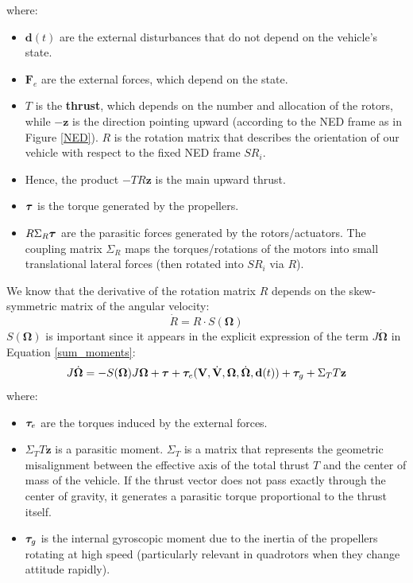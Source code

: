 \documentclass[10pt, a4paper]{report}
\begin{document}
where:\begin{itemize}
    \item $\mathbf d(t)$ are the external disturbances that do not depend on 
    the vehicle's state.
    \item $\mathbf F_e$ are the external forces, which depend on the state.
    \item $T$ is the \textbf{thrust}, which depends on the number and allocation of the rotors, while $-\mathbf z$ is the direction pointing upward (according to the NED frame as in Figure \ref{NED}). $R$ is the rotation matrix that describes the orientation of our vehicle with respect to the fixed NED frame $SR_i$.
    \item Hence, the product $-T R\mathbf z$ is the main upward thrust.
    \item ${\boldsymbol{\tau}}$ is the torque generated by the propellers.
    \item $R\Sigma_R{\boldsymbol{\tau}}$ are the parasitic forces generated by the rotors/actuators. The coupling matrix $\Sigma_R$ maps the torques/rotations of the motors into small translational lateral forces (then rotated into $SR_i$ via $R$).
\end{itemize}
We know that the derivative of the rotation matrix $R$ depends on the skew-symmetric matrix of the angular velocity:\begin{equation}
    \dot R= R\cdot S(\boldsymbol{\Omega})
\end{equation}
$S(\boldsymbol{\Omega})$ is important since it appears in the explicit expression of the term $ J\dot{\boldsymbol{\Omega}} $ in Equation \eqref{sum_moments}:
\begin{equation}
    J\dot{\boldsymbol{\Omega}}=-S(\boldsymbol{\Omega})J\boldsymbol{\Omega}+{\boldsymbol{\tau}}+
    {\boldsymbol{\tau}}_e(\mathbf V,\dot{\mathbf V},\boldsymbol{\Omega},\dot{\boldsymbol{\Omega}},\mathbf d(t))+ {\boldsymbol{\tau}}_g+ 
    \Sigma_T T \mathbf z
\end{equation}
where:\begin{itemize}
    \item ${\boldsymbol{\tau}}_e$ are the torques induced by the external forces.
    \item $\Sigma_T T \mathbf z$ is a parasitic moment. $\Sigma_T$ is a matrix that represents the geometric misalignment between the effective axis of the total thrust $T$ and the center of mass of the vehicle. If the thrust vector does not pass exactly through the center of gravity, it generates a parasitic torque proportional to the thrust itself.
    \item ${\boldsymbol{\tau}}_g$ is the internal gyroscopic moment due to the inertia of the propellers rotating at high speed (particularly relevant in quadrotors when they change attitude rapidly).
\end{itemize}
\end{document}
